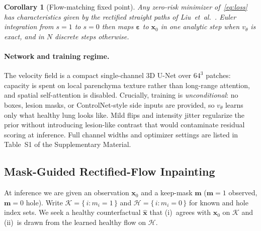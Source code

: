 \documentclass[twoside]{article}
\newtheorem{corollary}{Corollary}
\newcommand{\suppTabHparams}{Table~S1}
\begin{document}
\begin{corollary}[Flow-matching fixed point]
\label{cor:fm}
Any zero-risk minimizer of~\eqref{eq:loss} has characteristics given by the
rectified straight paths of Liu~et~al.~\cite{liu2023flow}.
Euler integration from \(s{=}1\) to \(s{=}0\) then maps
\(\boldsymbol{\varepsilon}\) to \(\mathbf{x}_0\) in one analytic step when
\(v_\theta\) is exact, and in \(N\) discrete steps otherwise.
\end{corollary}

\paragraph{Network and training regime.}
The velocity field is a compact single-channel 3D U-Net over \(64^{3}\)
patches: capacity is spent on local parenchyma texture rather than
long-range attention, and spatial self-attention is disabled.
Crucially, training is \emph{unconditional}: no boxes, lesion masks, or
ControlNet-style side inputs are provided, so \(v_\theta\) learns only
what healthy lung looks like.
Mild flips and intensity jitter regularize the prior without introducing
lesion-like contrast that would contaminate residual scoring at inference.
Full channel widths and optimizer settings are listed in
\suppTabHparams{} of the Supplementary Material.

\subsection{Mask-Guided Rectified-Flow Inpainting}
\label{sec:method:repaint}

At inference we are given an observation \(\mathbf{x}_0\) and a keep-mask
\(\mathbf{m}\) (\(\mathbf{m}=1\) observed, \(\mathbf{m}=0\) hole).
Write \(\mathcal{K}=\{\,i:m_i=1\,\}\) and \(\mathcal{H}=\{\,i:m_i=0\,\}\)
for known and hole index sets.
We seek a healthy counterfactual \(\hat{\mathbf{x}}\) that
(i)~agrees with \(\mathbf{x}_0\) on \(\mathcal{K}\) and
(ii)~is drawn from the learned healthy flow on \(\mathcal{H}\).
\end{document}
